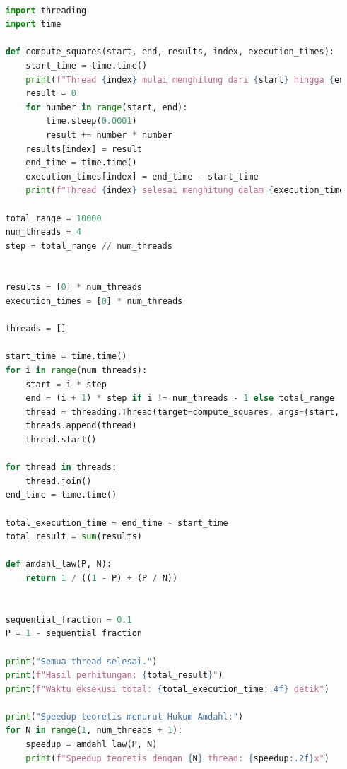 \documentclass[12pt]{article}
\begin{document}
\begin{lstlisting}[language=Python]

    import threading
    import time
    
    def compute_squares(start, end, results, index, execution_times):
        start_time = time.time()
        print(f"Thread {index} mulai menghitung dari {start} hingga {end}...")
        result = 0
        for number in range(start, end):
            time.sleep(0.0001) 
            result += number * number
        results[index] = result
        end_time = time.time()
        execution_times[index] = end_time - start_time
        print(f"Thread {index} selesai menghitung dalam {execution_times[index]:.4f} detik.")
    
    total_range = 10000
    num_threads = 4  
    step = total_range // num_threads
    
    
    results = [0] * num_threads
    execution_times = [0] * num_threads
    
    threads = []
    
    start_time = time.time()
    for i in range(num_threads):
        start = i * step
        end = (i + 1) * step if i != num_threads - 1 else total_range
        thread = threading.Thread(target=compute_squares, args=(start, end, results, i, execution_times))
        threads.append(thread)
        thread.start()
    
    for thread in threads:
        thread.join()
    end_time = time.time()
    
    total_execution_time = end_time - start_time
    total_result = sum(results)
    
    def amdahl_law(P, N):
        return 1 / ((1 - P) + (P / N))
    
    
    sequential_fraction = 0.1  
    P = 1 - sequential_fraction
    
    print("Semua thread selesai.")
    print(f"Hasil perhitungan: {total_result}")
    print(f"Waktu eksekusi total: {total_execution_time:.4f} detik")
    
    print("Speedup teoretis menurut Hukum Amdahl:")
    for N in range(1, num_threads + 1):  
        speedup = amdahl_law(P, N)
        print(f"Speedup teoretis dengan {N} thread: {speedup:.2f}x")
    
\end{lstlisting}
\end{document}
